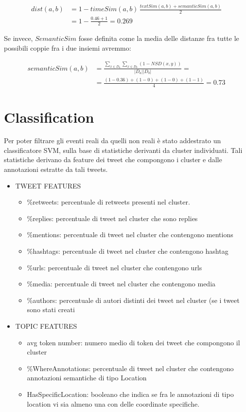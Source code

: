 \documentclass[a4paper,12pt]{report}
\begin{document}
 \begin{align*}
dist(a,b)&=1- timeSim(a,b)\,\frac{textSim(a,b)+semanticSim(a,b)}{2}\\
&=1-\frac{0.46+1}{2}=0.269
\end{align*}

Se invece, $SemanticSim$ fosse definita come la media delle distanze fra tutte le possibili coppie fra i due insiemi avremmo: 

\begin{align*}
	semanticSim(a,b)&=\frac{\sum\limits_{x \in D_a} \sum\limits_{x \in D_b}  (1-NSD(x,y))}{|D_a||D_b|}=\\
	&=\frac{(1-0.36)+(1-0)+(1-0)+(1-1)}{4}=0.73
\end{align*}
  
 
 


\newpage
\section{Classification}
Per poter filtrare gli eventi reali da quelli non reali è stato addestrato un classificatore SVM, sulla base di statistiche derivanti da cluster individuati. Tali statistiche derivano da feature dei tweet che compongono i cluster e dalle annotazioni estratte da tali tweets.
\begin{itemize}
\item TWEET FEATURES
\begin{itemize}
	\item	\%retweets:  percentuale di retweets presenti nel cluster. 
\item	\%replies:      percentuale di tweet nel cluster che sono replies
\item	\%mentions: percentuale di tweet nel cluster che contengono mentions
\item	\%hashtags:  percentuale di tweet nel cluster che contengono hashtag
\item	\%urls: percentuale di tweet nel cluster che contengono urls
\item	\%media: percentuale di tweet nel cluster che contengono media
\item	\%authors: percentuale di autori distinti dei tweet nel cluster (se i tweet sono stati creati 
\end{itemize}
\item TOPIC FEATURES
\begin{itemize}
\item avg token number: numero medio di token dei tweet che compongono il cluster
\item \%WhereAnnotations: percentuale di tweet nel cluster che contengono annotazioni semantiche di tipo Location
\item HasSpecificLocation: booleano che indica se fra le annotazioni di tipo location vi sia almeno una con delle coordinate specifiche.
\end{itemize}
\end{itemize}


\printbibliography
\end{document}
